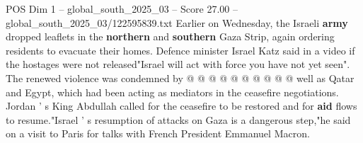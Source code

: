 \begin{textsample}{POS Dim 1 – global\_south\_2025\_03 – Score 27.00 – global\_south\_2025\_03/122595839.txt}
Earlier on Wednesday, the Israeli \textbf{army} dropped leaflets in the \textbf{northern} and \textbf{southern} Gaza Strip, again ordering residents to evacuate their homes.
Defence minister Israel Katz said in a video if the hostages were not released"Israel will act with force you have not yet seen".
The renewed violence was condemned by @ @ @ @ @ @ @ @ @ @ well as Qatar and Egypt, which had been acting as mediators in the ceasefire negotiations.
Jordan ' s King Abdullah called for the ceasefire to be restored and for \textbf{aid} flows to resume."Israel ' s resumption of attacks on Gaza is a dangerous step,"he said on a visit to Paris for talks with French President Emmanuel Macron.

\end{textsample}
